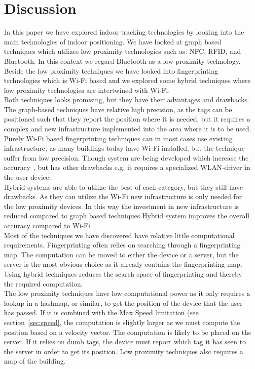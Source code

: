 \section{Discussion}
In this paper we have explored indoor tracking technologies by looking into the main technologies of indoor positioning. 
We have looked at graph based techniques which utilizes low proximity technologies such as: NFC, RFID, and Bluetooth. 
In this context we regard Bluetooth as a low proximity technology. 
Beside the low proximity techniques we have looked into fingerprinting technologies which is Wi-Fi based and we explored some hybrid techniques where low proximity technologies are intertwined with Wi-Fi. \\

Both techniques looks promising, but they have their advantages and drawbacks. 
The graph-based techniques have relative high precision, as the tags can be positioned such that they report the position where it is needed, but it requires a complex and new infrastructure implemented into the area where it is to be used. \\

Purely Wi-Fi based fingerprinting techniques can in most cases use existing infrastructure, as many buildings today  have Wi-Fi installed, but the technique suffer from low precision.
Though system are being developed which increase the accuracy~\cite{Youssef2005}, but has other drawbacks e.g. it requires a specialized WLAN-driver in the user device. \\

Hybrid systems are able to utilize the best of each category, but they still have drawbacks. 
As they can utilize the Wi-Fi new infrastructure is only needed for the low proximity devices.
In this way the investment in new infrastructure is reduced compared to graph based techniques
Hybrid system improves the overall accuracy compared to Wi-Fi. \\

Most of the techniques we have discovered have relative little computational requirements. 
Fingerprinting often relies on searching through a fingerprinting map. 
The computation can be moved to either the device or a server, but the server is the most obvious choice as it already contains the fingerprinting map. 
Using hybrid techniques reduces the search space of fingerprinting and thereby the required computation. \\

The low proximity techniques have low computational power as it only requires a lookup in a hashmap, or similar, to get the position of the device that the user has passed. 
If it is combined with the Max Speed limitation (see section~\ref{sec:speed}, the computation is slightly larger as we must compute the position based on a velocity vector. 
The computation is likely to be placed on the server. 
If it relies on dumb tags, the device must report which tag it has seen to the server in order to get its position. 
Low proximity techniques also requires a map of the building.\\

